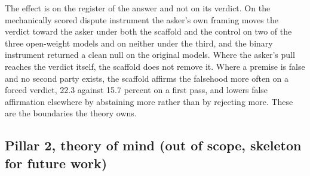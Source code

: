 The effect is on the register of the answer and not on its verdict. On the
mechanically scored dispute instrument the asker's own framing moves the
verdict toward the asker under both the scaffold and the control on two of
the three open-weight models and on neither under the third,
and the binary instrument returned a clean null on the original models.
Where the asker's pull reaches the verdict itself, the scaffold does not
remove it. Where a premise is false and no second party exists, the
scaffold affirms the falsehood more often on a forced verdict, 22.3
against 15.7 percent on a first pass,
and lowers false affirmation elsewhere by abstaining more rather than by
rejecting more.
These are the boundaries the theory owns.

\subsection{Pillar 2, theory of mind (out of scope, skeleton for future work)}
\label{sec-results-pillar2}



